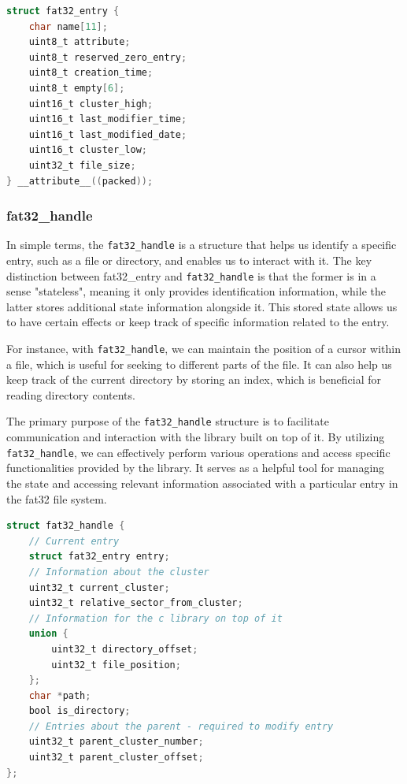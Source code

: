 \begin{lstlisting}[caption={fat32\_entry},captionpos=b,language=C,frame=single,breaklines]
struct fat32_entry {
    char name[11];
    uint8_t attribute;
    uint8_t reserved_zero_entry;
    uint8_t creation_time;
    uint8_t empty[6];
    uint16_t cluster_high;
    uint16_t last_modifier_time;
    uint16_t last_modified_date;
    uint16_t cluster_low;
    uint32_t file_size;
} __attribute__((packed));
\end{lstlisting}

\subsubsection{fat32\_handle}

In simple terms, the \texttt{fat32\_handle} is a structure that helps us identify a specific entry, such as a file or directory, and enables us to interact with it. The key distinction between fat32\_entry and \texttt{fat32\_handle} is that the former is in a sense "stateless", meaning it only provides identification information, while the latter stores additional state information alongside it. This stored state allows us to have certain effects or keep track of specific information related to the entry.

For instance, with \texttt{fat32\_handle}, we can maintain the position of a cursor within a file, which is useful for seeking to different parts of the file. It can also help us keep track of the current directory by storing an index, which is beneficial for reading directory contents.

The primary purpose of the \texttt{fat32\_handle} structure is to facilitate communication and interaction with the library built on top of it. By utilizing \texttt{fat32\_handle}, we can effectively perform various operations and access specific functionalities provided by the library. It serves as a helpful tool for managing the state and accessing relevant information associated with a particular entry in the fat32 file system.

\begin{lstlisting}[caption={fat32\_handle},captionpos=b,language=C,frame=single,breaklines]
struct fat32_handle {
    // Current entry
    struct fat32_entry entry;
    // Information about the cluster
    uint32_t current_cluster;
    uint32_t relative_sector_from_cluster;
    // Information for the c library on top of it
    union {
        uint32_t directory_offset;
        uint32_t file_position;
    };
    char *path;
    bool is_directory;
    // Entries about the parent - required to modify entry
    uint32_t parent_cluster_number;
    uint32_t parent_cluster_offset;
};
\end{lstlisting}

